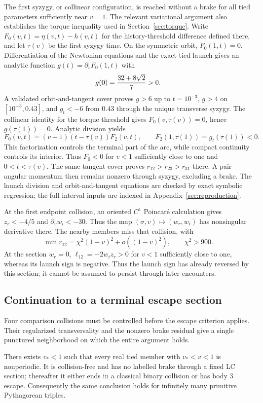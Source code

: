 The first syzygy, or collinear configuration, is reached without a brake
for all tied parameters sufficiently near $v=1$. The relevant variational
argument also establishes the torque inequality used in
Section~\ref{sec:torque}. Write
$F_0(v,t)=\eta(v,t)-h(v,t)$ for the history-threshold difference defined
there, and let $\tau(v)$ be the first syzygy time. On the symmetric orbit,
$F_0(1,t)=0$. Differentiation of the Newtonian equations and the exact
tied launch gives an analytic function $g(t)=\partial_vF_0(1,t)$ with
\[
 g(0)={32+8\sqrt2\over7}>0.
\]
A validated orbit-and-tangent cover proves $g>6$ up to $t=10^{-3}$,
$g>4$ on $[10^{-3},0.43]$, and $g_t<-6$ from $0.43$ through the
unique transverse syzygy. The collinear identity for the torque threshold
gives $F_0(v,\tau(v))=0$, hence $g(\tau(1))=0$. Analytic division yields
\[
 F_0(v,t)=(v-1)(t-\tau(v))F_2(v,t),\qquad
 F_2(1,\tau(1))=g_t(\tau(1))<0.
\]
This factorization controls the terminal part of the arc, while compact
continuity controls its interior. Thus $F_0<0$ for $v<1$ sufficiently
close to one and $0<t<\tau(v)$. The same tangent cover proves
$r_{12}>r_{23}>r_{31}$ there. A pair angular momentum then remains
nonzero through syzygy, excluding a brake. The launch division and
orbit-and-tangent equations are checked by exact symbolic regression;
the full interval inputs are indexed in Appendix~\ref{sec:reproduction}.

At the first endpoint collision, an oriented $C^1$ Poincar\'e calculation
gives $z_r<-4/5$ and $\partial_v w_i<-30$. Thus the map
$(\sigma,v)\mapsto(w_r,w_i)$ has nonsingular derivative there. The nearby
members miss that collision, with
\[
 \min r_{12}=\chi^2(1-v)^2+o((1-v)^2),\qquad \chi^2>900.
\]
At the section $w_r=0$,
$\ell_{12}=-2w_i z_r>0$ for $v<1$ sufficiently close to one, whereas
its launch sign is negative. Thus the launch sign has already reversed
by this section; it cannot be assumed to persist through later encounters.

\subsection{Continuation to a terminal escape section}

Four comparison collisions must be controlled before the escape criterion
applies. Their regularized transversality and the nonzero brake residual
give a single punctured neighborhood on which the entire argument holds.

\begin{theorem}
There exists $v_*<1$ such that every real tied member with
$v_*<v<1$ is nonperiodic.  It is collision-free and has no labelled brake
through a fixed LC section; thereafter it either ends in a classical binary
collision or has body 3 escape.  Consequently the same conclusion holds for
infinitely many primitive Pythagorean triples.
\end{theorem}

